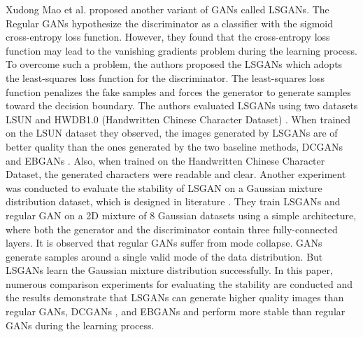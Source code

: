 Xudong Mao et al.\cite{mao2017squares} proposed another variant of \acp{GAN} called \acp{LSGAN}. The Regular GANs hypothesize the discriminator as a classifier with the sigmoid cross-entropy loss function. However, they found that the cross-entropy loss function may lead to the vanishing gradients problem during the learning process. To overcome such a problem, the authors proposed the \acp{LSGAN} which adopts the least-squares loss function for the discriminator. The least-squares loss function penalizes the fake samples and forces the generator to generate samples toward the decision boundary. The authors evaluated \acp{LSGAN} using two datasets LSUN \cite{yu2016lsun} and HWDB1.0 (Handwritten Chinese Character Dataset) \cite{6065551}. When trained on the LSUN dataset \cite{yu2016lsun} they observed, the images generated by \acp{LSGAN} are of better quality than the ones generated by the two baseline methods, DCGANs \cite{radford2016unsupervised} and EBGANs \cite{zhao2017energybased}. Also, when trained on the Handwritten Chinese Character Dataset, the generated characters were readable and clear. Another experiment was conducted to evaluate the stability of \ac{LSGAN} on a Gaussian mixture distribution dataset, which is designed in literature \cite{metz2017unrolled}. They train \acp{LSGAN} and regular \ac{GAN} on a 2D mixture of 8 Gaussian datasets using a simple architecture, where both the generator and the discriminator contain three fully-connected layers. It is observed that regular \acp{GAN} suffer from mode collapse. \acp{GAN} generate samples around a single valid mode of the data distribution. But \acp{LSGAN} learn the Gaussian mixture distribution successfully. In this paper, numerous comparison experiments for evaluating the stability are conducted and the results demonstrate that \acp{LSGAN} can generate higher quality images than regular \acp{GAN}, DCGANs \cite{radford2016unsupervised}, and EBGANs \cite{zhao2017energybased} and perform more stable than regular \acp{GAN} during the learning process.



